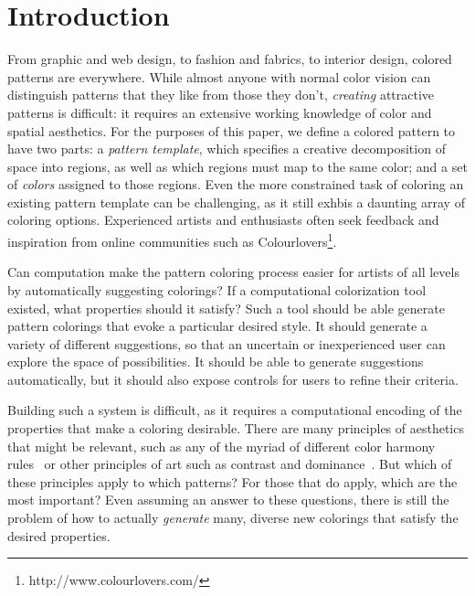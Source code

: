 \section{Introduction}
\label{sec:introduction}

From graphic and web design, to fashion and fabrics, to interior design, colored patterns are everywhere. While almost anyone with normal color vision can distinguish patterns that they like from those they don't, \emph{creating} attractive patterns is difficult: it requires an extensive working knowledge of color and spatial aesthetics. For the purposes of this paper, we define a colored pattern to have two parts: a \emph{pattern template}, which specifies a creative decomposition of space into regions, as well as which regions must map to the same color; and a set of \emph{colors} assigned to those regions. Even the more constrained task of coloring an existing pattern template can be challenging, as it still exhbis a daunting array of coloring options. Experienced artists and enthusiasts often seek feedback and inspiration from online communities such as Colourlovers\footnote{http://www.colourlovers.com/}.

Can computation make the pattern coloring process easier for artists of all levels by automatically suggesting colorings? If a computational colorization tool existed, what properties should it satisfy? Such a tool should be able generate pattern colorings that evoke a particular desired style. It should generate a variety of different suggestions, so that an uncertain or inexperienced user can explore the space of possibilities. It should be able to generate suggestions automatically, but it should also expose controls for users to refine their criteria.

Building such a system is difficult, as it requires a computational encoding of the properties that make a coloring desirable. There are many principles of aesthetics that might be relevant, such as any of the myriad of different color harmony rules~\cite{ColorHarmonyBook} or other principles of art such as contrast and dominance~\cite{ArtPrinciples}. But which of these principles apply to which patterns? For those that do apply, which are the most important? Even assuming an answer to these questions, there is still the problem of how to actually \emph{generate} many, diverse new colorings that satisfy the desired properties.

